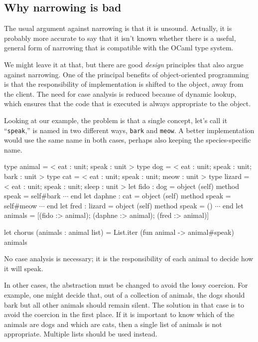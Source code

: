 \subsection{Why narrowing is bad}

The usual argument against narrowing is that it is unsound.  Actually, it is probably more accurate
to say that it isn't known whether there is a useful, general form of narrowing that is compatible
with the OCaml type system.

We might leave it at that, but there are good \emph{design} principles that also argue against
narrowing.  One of the principal benefits of object-oriented programming is that the responsibility
of implementation is shifted to the object, away from the client.  The need for case analysis is
reduced because of dynamic lookup, which ensures that the code that is executed is always appropriate
to the object.

Looking at our example, the problem is that a single concept, let's call it ``\hbox{\lstinline/speak/},'' is named in two
different ways, \hbox{\lstinline/bark/} and \hbox{\lstinline/meow/}.  A better implementation would use the same
name in both cases, perhaps also keeping the species-specific name.

\begin{ocaml}
type animal = < eat : unit; speak : unit >
type dog = < eat : unit; speak : unit; bark : unit >
type cat = < eat : unit; speak : unit; meow : unit >
type lizard = < eat : unit; speak : unit; sleep : unit >
let fido : dog = object (self) method speak = self#bark $\cdots$ end
let daphne : cat = object (self) method speak = self#meow $\cdots$ end
let fred : lizard = object (self) method speak = () $\cdots$ end
let animals = [(fido :> animal); (daphne :> animal); (fred :> animal)]

let chorus (animals : animal list) =
   List.iter (fun animal -> animal#speak) animals
\end{ocaml}
%
No case analysis is necessary; it is the responsibility of each animal to decide how it will speak.

In other cases, the abstraction must be changed to avoid the lossy coercion.  For example, one might
decide that, out of a collection of animals, the dogs should bark but all other animals should
remain silent.  The solution in that case is to avoid the coercion in the first place.  If it is
important to know which of the animals are dogs and which are cats, then a single list of animals is
not appropriate.  Multiple lists should be used instead.

